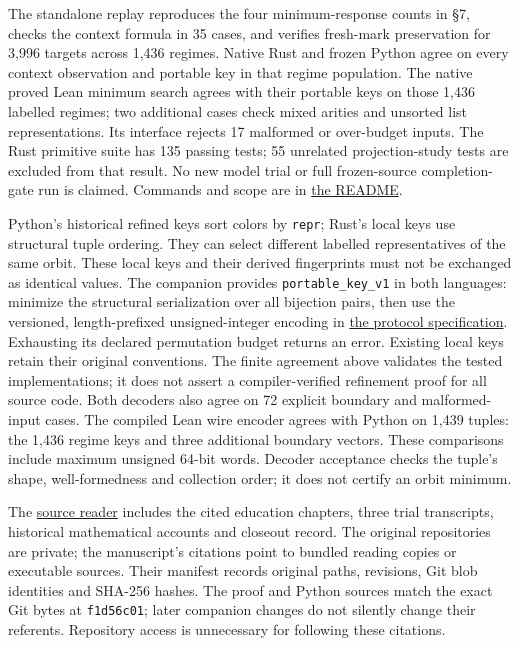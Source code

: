 \documentclass[
  11pt,
]{article}
\begin{document}
The standalone replay reproduces the four minimum-response counts in §7,
checks the context formula in 35 cases, and verifies fresh-mark
preservation for 3,996 targets across 1,436 regimes. Native Rust and
frozen Python agree on every context observation and portable key in
that regime population. The native proved Lean minimum search agrees
with their portable keys on those 1,436 labelled regimes; two additional
cases check mixed arities and unsorted list representations. Its
interface rejects 17 malformed or over-budget inputs. The Rust primitive
suite has 135 passing tests; 55 unrelated projection-study tests are
excluded from that result. No new model trial or full frozen-source
completion-gate run is claimed. Commands and scope are in
\href{README.md}{the README}.

Python's historical refined keys sort colors by \nolinkurl{repr}; Rust's
local keys use structural tuple ordering. They can select different
labelled representatives of the same orbit. These local keys and their
derived fingerprints must not be exchanged as identical values. The
companion provides \nolinkurl{portable_key_v1} in both languages:
minimize the structural serialization over all bijection pairs, then use
the versioned, length-prefixed unsigned-integer encoding in
\href{docs/portable_keys.md}{the protocol specification}. Exhausting its
declared permutation budget returns an error. Existing local keys retain
their original conventions. The finite agreement above validates the
tested implementations; it does not assert a compiler-verified
refinement proof for all source code. Both decoders also agree on 72
explicit boundary and malformed-input cases. The compiled Lean wire
encoder agrees with Python on 1,439 tuples: the 1,436 regime keys and
three additional boundary vectors. These comparisons include maximum
unsigned 64-bit words. Decoder acceptance checks the tuple's shape,
well-formedness and collection order; it does not certify an orbit
minimum.

The \href{docs/references.md}{source reader} includes the cited
education chapters, three trial transcripts, historical mathematical
accounts and closeout record. The original repositories are private; the
manuscript's citations point to bundled reading copies or executable
sources. Their manifest records original paths, revisions, Git blob
identities and SHA-256 hashes. The proof and Python sources match the
exact Git bytes at \nolinkurl{f1d56c01}; later companion changes do not
silently change their referents. Repository access is unnecessary for
following these citations.
\end{document}
